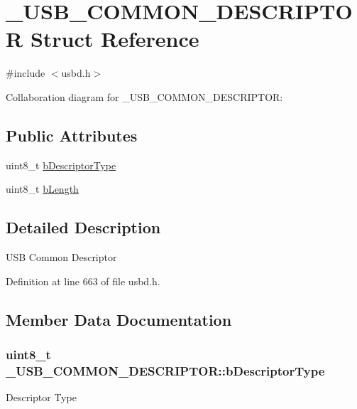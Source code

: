 \hypertarget{struct__USB__COMMON__DESCRIPTOR}{}\section{\+\_\+\+U\+S\+B\+\_\+\+C\+O\+M\+M\+O\+N\+\_\+\+D\+E\+S\+C\+R\+I\+P\+T\+OR Struct Reference}
\label{struct__USB__COMMON__DESCRIPTOR}


{\ttfamily \#include $<$usbd.\+h$>$}



Collaboration diagram for \+\_\+\+U\+S\+B\+\_\+\+C\+O\+M\+M\+O\+N\+\_\+\+D\+E\+S\+C\+R\+I\+P\+T\+OR\+:
\subsection*{Public Attributes}
\begin{DoxyCompactItemize}
\item 
uint8\+\_\+t \hyperlink{struct__USB__COMMON__DESCRIPTOR_a67186df405d9bc8ed78bcf60926be924}{b\+Descriptor\+Type}
\item 
uint8\+\_\+t \hyperlink{struct__USB__COMMON__DESCRIPTOR_a3b232c5c49b059c8df010496ca69868b}{b\+Length}
\end{DoxyCompactItemize}


\subsection{Detailed Description}
U\+SB Common Descriptor 

Definition at line 663 of file usbd.\+h.



\subsection{Member Data Documentation}
\subsubsection[{\texorpdfstring{b\+Descriptor\+Type}{bDescriptorType}}]{\setlength{\rightskip}{0pt plus 5cm}uint8\+\_\+t \+\_\+\+U\+S\+B\+\_\+\+C\+O\+M\+M\+O\+N\+\_\+\+D\+E\+S\+C\+R\+I\+P\+T\+O\+R\+::b\+Descriptor\+Type}\hypertarget{struct__USB__COMMON__DESCRIPTOR_a67186df405d9bc8ed78bcf60926be924}{}\label{struct__USB__COMMON__DESCRIPTOR_a67186df405d9bc8ed78bcf60926be924}
Descriptor Type 

